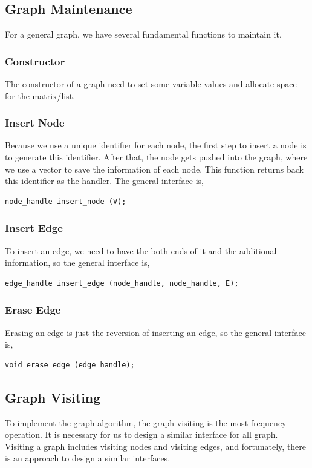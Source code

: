 \documentclass[]{article}
\begin{document}
\subsection{Graph Maintenance} 
For a general graph, we have several fundamental functions to maintain it.

\subsubsection {Constructor}
The constructor of a graph need to set some variable values and allocate space for the matrix/list.
\subsubsection {Insert Node}
Because we use a unique identifier for each node, the first step to insert a node is to generate this identifier. After that, the node gets pushed into the graph, where we use a vector to save the information of each node. This function returns back this identifier as the handler. The general interface is,
\begin{lstlisting}
node_handle insert_node (V);
\end{lstlisting}
\subsubsection {Insert Edge}
To insert an edge, we need to have the both ends of it and the additional information, so the general interface is,
\begin{lstlisting}
edge_handle insert_edge (node_handle, node_handle, E);
\end{lstlisting}
\subsubsection {Erase Edge}
Erasing an edge is just the reversion of inserting an edge, so the general interface is,
\begin{lstlisting}
void erase_edge (edge_handle);
\end{lstlisting}
\subsection{Graph Visiting}
To implement the graph algorithm, the graph visiting is the most frequency operation. It is necessary for us to design a similar interface for all graph. Visiting a graph includes visiting nodes and visiting edges, and fortunately, there is an approach to design a similar interfaces. 
\end{document}
